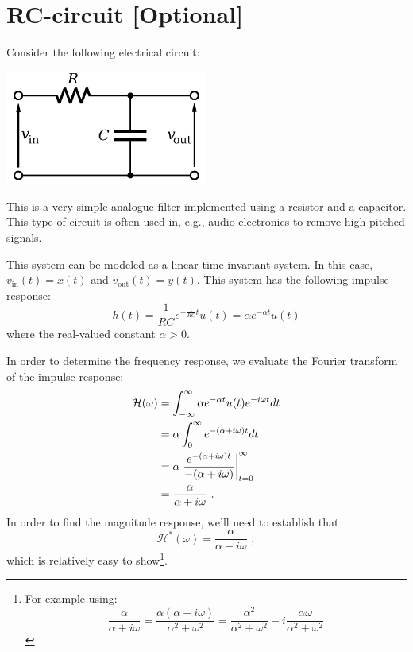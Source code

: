 \newpage
\section{RC-circuit [Optional]}
Consider the following electrical circuit:
\begin{center}
\includegraphics[width=0.5\textwidth]{Applications/figures/rc.pdf}
\end{center}
This is a very simple analogue filter implemented using a resistor and
a capacitor. This type of circuit is often used in, e.g., audio
electronics to remove high-pitched signals.

This system can be modeled as a linear time-invariant system. In this
case, $v_{\mathrm{in}}(t) = x(t)$ and $v_{\mathrm{out}}(t) =
y(t)$. This system has the following impulse response:
\begin{equation}
h(t) = \frac{1}{RC} e^{-\frac{1}{RC}t}u(t) = \alpha e^{-\alpha t} u(t)
\end{equation}
where the real-valued constant $\alpha > 0$. 

In order to determine the frequency response, we evaluate the Fourier 
transform of the impulse response:
\begin{align}
\mathcal{H}(\omega) &= \int_{-\infty}^{\infty} \alpha e^{-\alpha t} u(t) e^{-i\omega t}dt \\
     &= \alpha \int_{0}^{\infty} e^{-(\alpha+i\omega) t} dt \\
     &= \alpha \left. \frac{e^{-(\alpha+i\omega)t}}{-(\alpha+i\omega)}\right\rvert_{t=0}^{\infty} \\
     &= \frac{\alpha}{\alpha + i\omega}\,\,.
\end{align}
In order to find the magnitude response, we'll need to establish that
\begin{equation}
  \mathcal{H}^*(\omega) = \frac{\alpha}{\alpha - i\omega}\,\,,
\end{equation}
which is relatively easy to show\footnote{For example using: \begin{equation*}\frac{\alpha}{\alpha + i \omega} = \frac{\alpha(\alpha - i\omega)}{\alpha^2 + \omega^2} = \frac{\alpha^2}{\alpha^2 + \omega^2} - i\frac{\alpha\omega}{\alpha^2 + \omega^2}\end{equation*}}.

